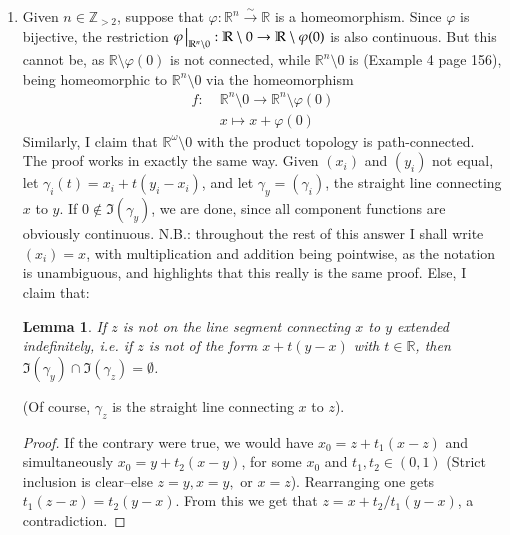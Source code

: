\documentclass[12pt]{article}
\newtheorem{lemma}{Lemma}
\theoremstyle{definitionstyle}
\def\mbb#1{\mathbb{#1}}
\def \R{\mbb{R}}
\def\bZ{\mbb{Z}}
\def \cph{\varphi}
\begin{document}
\begin{enumerate}[leftmargin=\labelsep]
		\item Given $n \in \bZ_{>2}$, suppose that $\cph: \R^n \overset{\sim}{\to} \R$ is a homeomorphism. Since $\cph$ is bijective, the restriction $\cph \eval_{\R^n \setminus 0}: \R \setminus 0 \to \R \setminus \cph(0)$ is also continuous. But this cannot be, as $\R \setminus \cph(0)$ is not connected, while $\R^n \setminus 0$ is (Example 4 page 156), being homeomorphic to $\R^n \setminus 0$ via the homeomorphism \begin{align*}
			f:\; &\R^n \setminus 0 \to \R^n \setminus \cph(0) \\
			&x \mapsto x + \cph(0)
		\end{align*}
		Similarly, I claim that $\R^{\omega} \setminus 0$ with the product topology is path-connected. The proof works in exactly the same way. Given $(x_i)$ and $(y_i)$ not equal, let $\gamma_i(t) = x_i + t(y_i-x_i)$, and let $\gamma_y = (\gamma_i)$, the straight line connecting $x$ to $y$. If $0 \not \in \Im(\gamma_y)$, we are done, since all component functions are obviously continuous. N.B.: throughout the rest of this answer I shall write $(x_i) = x$, with multiplication and addition being pointwise, as the notation is unambiguous, and highlights that this really is the same proof. Else, I claim that:
		\begin{lemma}
			If $z$ is not on the line segment connecting $x$ to $y$ extended indefinitely, i.e. if $z$ is not of the form $x + t(y-x)$ with $t \in \R$, then $\Im(\gamma_y) \cap \Im(\gamma_z) = \emptyset$.
		\end{lemma} (Of course, $\gamma_z$ is the straight line connecting $x$ to $z$). 
		\begin{proof}
			If the contrary were true, we would have $x_0 = z + t_1(x-z)$ and simultaneously $x_0 = y + t_2(x-y)$, for some $x_0$ and $t_1, t_2 \in (0, 1)$ (Strict inclusion is clear--else $z=y, x=y,$ or $x=z$). Rearranging one gets $t_1(z-x) = t_2(y-x)$. From this we get that $z = x + t_2/t_1(y-x)$, a contradiction.

\end{proof}
\end{enumerate}
\end{document}
